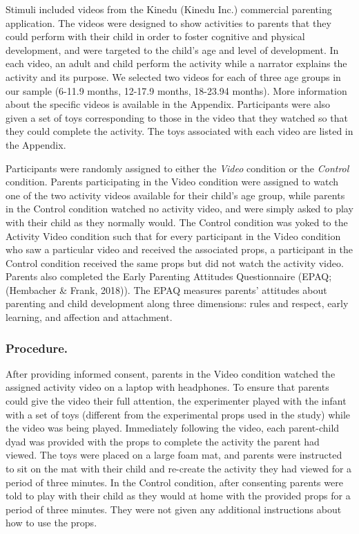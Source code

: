 \documentclass[]{article}
\begin{document}
Stimuli included videos from the Kinedu (Kinedu Inc.) commercial
parenting application. The videos were designed to show activities to
parents that they could perform with their child in order to foster
cognitive and physical development, and were targeted to the child's age
and level of development. In each video, an adult and child perform the
activity while a narrator explains the activity and its purpose. We
selected two videos for each of three age groups in our sample (6-11.9
months, 12-17.9 months, 18-23.94 months). More information about the
specific videos is available in the Appendix. Participants were also
given a set of toys corresponding to those in the video that they
watched so that they could complete the activity. The toys associated
with each video are listed in the Appendix.

Participants were randomly assigned to either the \emph{Video} condition
or the \emph{Control} condition. Parents participating in the Video
condition were assigned to watch one of the two activity videos
available for their child's age group, while parents in the Control
condition watched no activity video, and were simply asked to play with
their child as they normally would. The Control condition was yoked to
the Activity Video condition such that for every participant in the
Video condition who saw a particular video and received the associated
props, a participant in the Control condition received the same props
but did not watch the activity video. Parents also completed the Early
Parenting Attitudes Questionnaire (EPAQ; (Hembacher \& Frank, 2018)).
The EPAQ measures parents' attitudes about parenting and child
development along three dimensions: rules and respect, early learning,
and affection and attachment.

\hypertarget{procedure.}{%
\subsubsection{Procedure.}\label{procedure.}}

After providing informed consent, parents in the Video condition watched
the assigned activity video on a laptop with headphones. To ensure that
parents could give the video their full attention, the experimenter
played with the infant with a set of toys (different from the
experimental props used in the study) while the video was being played.
Immediately following the video, each parent-child dyad was provided
with the props to complete the activity the parent had viewed. The toys
were placed on a large foam mat, and parents were instructed to sit on
the mat with their child and re-create the activity they had viewed for
a period of three minutes. In the Control condition, after consenting
parents were told to play with their child as they would at home with
the provided props for a period of three minutes. They were not given
any additional instructions about how to use the props.
\end{document}
